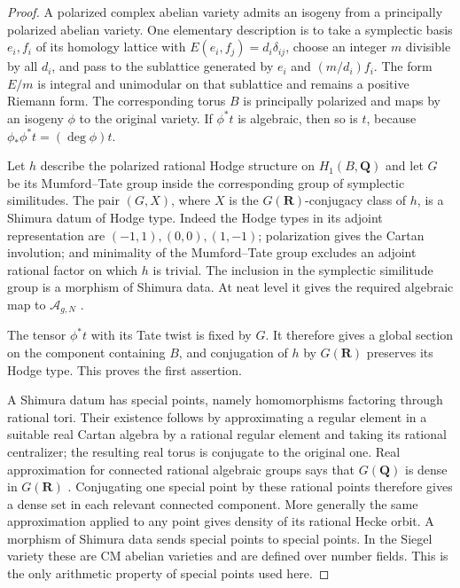 \documentclass[11pt]{article}
\theoremstyle{definition}
\theoremstyle{remark}
\newcommand{\Q}{\mathbf Q}
\newcommand{\R}{\mathbf R}
\begin{document}
\begin{proof}
A polarized complex abelian variety admits an isogeny from a principally polarized abelian variety. One elementary description is to take a symplectic basis $e_i,f_i$ of its homology lattice with $E(e_i,f_j)=d_i\delta_{ij}$, choose an integer $m$ divisible by all $d_i$, and pass to the sublattice generated by $e_i$ and $(m/d_i)f_i$. The form $E/m$ is integral and unimodular on that sublattice and remains a positive Riemann form. The corresponding torus $B$ is principally polarized and maps by an isogeny $\phi$ to the original variety. If $\phi^*t$ is algebraic, then so is $t$, because $\phi_*\phi^*t=(\deg\phi)t$.

Let $h$ describe the polarized rational Hodge structure on $H_1(B,\Q)$ and let $G$ be its Mumford--Tate group inside the corresponding group of symplectic similitudes. The pair $(G,X)$, where $X$ is the $G(\R)$-conjugacy class of $h$, is a Shimura datum of Hodge type. Indeed the Hodge types in its adjoint representation are $(-1,1),(0,0),(1,-1)$; polarization gives the Cartan involution; and minimality of the Mumford--Tate group excludes an adjoint rational factor on which $h$ is trivial. The inclusion in the symplectic similitude group is a morphism of Shimura data. At neat level it gives the required algebraic map to $\mathcal A_{g,N}$ \cite[\S\S5--7]{MilneSV}.

The tensor $\phi^*t$ with its Tate twist is fixed by $G$. It therefore gives a global section on the component containing $B$, and conjugation of $h$ by $G(\R)$ preserves its Hodge type. This proves the first assertion.

A Shimura datum has special points, namely homomorphisms factoring through rational tori. Their existence follows by approximating a regular element in a suitable real Cartan algebra by a rational regular element and taking its rational centralizer; the resulting real torus is conjugate to the original one. Real approximation for connected rational algebraic groups says that $G(\Q)$ is dense in $G(\R)$ \cite[Theorem~5.4]{MilneSV}. Conjugating one special point by these rational points therefore gives a dense set in each relevant connected component. More generally the same approximation applied to any point gives density of its rational Hecke orbit. A morphism of Shimura data sends special points to special points. In the Siegel variety these are CM abelian varieties and are defined over number fields. This is the only arithmetic property of special points used here.
\end{proof}
\end{document}
